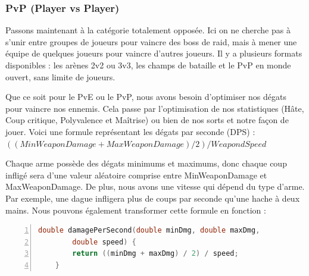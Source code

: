 \documentclass{article}
\begin{document}
\subsubsection{PvP (Player vs Player)}

Passons maintenant à la catégorie totalement opposée. Ici on ne cherche pas à s'unir entre
groupes de joueurs pour vaincre des boss de raid, mais à mener une équipe de quelques joueurs
pour vaincre d'autres joueurs. Il y a plusieurs formats disponibles : les arènes 2v2 ou 3v3,
les champs de bataille et le PvP en monde ouvert, sans limite de joueurs.\medskip

Que ce soit pour le PvE ou le PvP, nous avons besoin d'optimiser nos dégats pour vaincre nos
ennemis. Cela passe par l'optimisation de nos statistiques (Hâte, Coup critique, Polyvalence
et Maîtrise) ou bien de nos sorts et notre façon de jouer.\newline
Voici une formule représentant les dégats par seconde (DPS) :\newline
\indent$ ((MinWeaponDamage + MaxWeaponDamage) / 2) / WeapondSpeed $\bigskip

Chaque arme possède des dégats minimums et maximums, donc chaque coup infligé sera d'une
valeur aléatoire comprise entre MinWeaponDamage et MaxWeaponDamage. De plus, nous avons une
vitesse qui dépend du type d'arme. Par exemple, une dague infligera plus de coups par seconde
qu'une hache à deux mains.\medskip
Nous pouvons également transformer cette formule en fonction :
\begin{lstlisting}[language=C, numbers=left, frame=single]
    double damagePerSecond(double minDmg, double maxDmg, 
        double speed) {
        return ((minDmg + maxDmg) / 2) / speed;
    }
\end{lstlisting}

\pagebreak

\printbibliography[heading=bibintoc,title={Bibliographie}]
\end{document}
